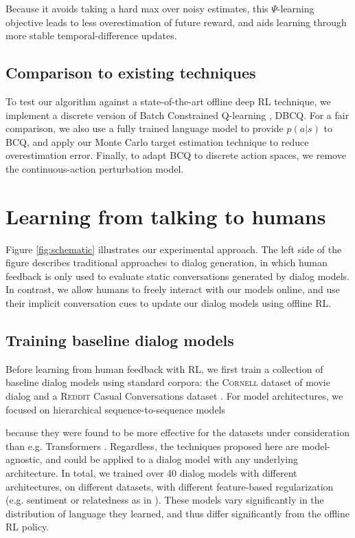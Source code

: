 Because it avoids taking a hard max over noisy estimates, this $\Psi$-learning objective leads to less overestimation of future reward, and aids learning through more stable temporal-difference updates. 

\subsection{Comparison to existing techniques} To test our algorithm against a state-of-the-art offline deep RL technique, we implement a discrete version of Batch Constrained Q-learning \cite{fujimoto2018off}, DBCQ. For a fair comparison, we also use a fully trained language model to provide $p(a|s)$ to BCQ, and apply our Monte Carlo target estimation technique to reduce overestimation error. Finally, to adapt BCQ to discrete action spaces, we remove the continuous-action perturbation model. 

\section{Learning from talking to humans} Figure \ref{fig:schematic} illustrates our experimental approach. The left side of the figure describes traditional approaches to dialog generation, in which human feedback is only used to evaluate static  conversations generated by dialog models. In contrast, we allow humans to freely interact with our models online, and use their implicit conversation cues to update our dialog models using offline RL. 

\subsection{Training baseline dialog models}
\label{sec:vanilla_training}
Before learning from human feedback with RL, we first train a collection of baseline dialog models using standard corpora: the \textsc{Cornell} dataset of movie dialog \cite{cornell_dataset} and a \textsc{Reddit} Casual Conversations dataset \cite{ghandeharioun2019approximating}. For model architectures, we focused on hierarchical sequence-to-sequence models \cite{serban2016building,serban2017hierarchical,park2018hierarchical}

because they were found to be more effective for the datasets under consideration than e.g. Transformers \cite{saleh2019hierarchical}. Regardless, the techniques proposed here are model-agnostic, and could be applied to a dialog model with any underlying architecture. In total, we trained over 40 dialog models with different architectures, on different datasets, with different feature-based regularization (e.g. sentiment or relatedness as in \citet{ghandeharioun2019approximating}). These models vary significantly in the distribution of language they learned, and thus differ significantly from the offline RL policy. 


